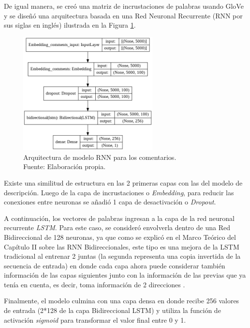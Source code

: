 De igual manera, se creó una matriz de incrustaciones de palabras usando GloVe y se diseñó una arquitectura basada en una Red Neuronal Recurrente (RNN por sus siglas en inglés) ilustrada en la Figura \ref{4:fig28}.

\begin{figure}[!ht]
	\begin{center}
		\includegraphics[width=0.63\textwidth]{4/figures/model_rnn_comments.png}
		\caption[Arquitectura de modelo RNN para los comentarios]{Arquitectura de modelo RNN para los comentarios.\\
			Fuente: Elaboración propia.}
		\label{4:fig28}
	\end{center}
\end{figure}

Existe una similitud de estructura en las 2 primeras capas con las del modelo de descripción. Luego de la capa de incrustaciones o \textit{Embedding}, para reducir las conexiones entre neuronas se añadió 1 capa de desactivación o \textit{Dropout}.

A continuación, los vectores de palabras ingresan a la capa de la red neuronal recurrente \textit{LSTM}. Para este caso, se consideró envolverla dentro de una Red Bidireccional de 128 neuronas, ya que como se explicó en el Marco Teórico del Capítulo II sobre las RNN Bidireccionales, este tipo es una mejora de la LSTM tradicional al entrenar 2 juntas (la segunda representa una copia invertida de la secuencia de entrada) en donde cada capa ahora puede considerar también información de las capas siguientes junto con la información de las previas que ya tenía en cuenta, es decir, toma información de 2 direcciones \parencite{tec_brownlee2017bidirectional_lstm}.

Finalmente, el modelo culmina con una capa densa en donde recibe 256 valores de entrada (2*128 de la capa Bidireccional LSTM) y utiliza la función de activación \textit{sigmoid} para transformar el valor final entre 0 y 1.

